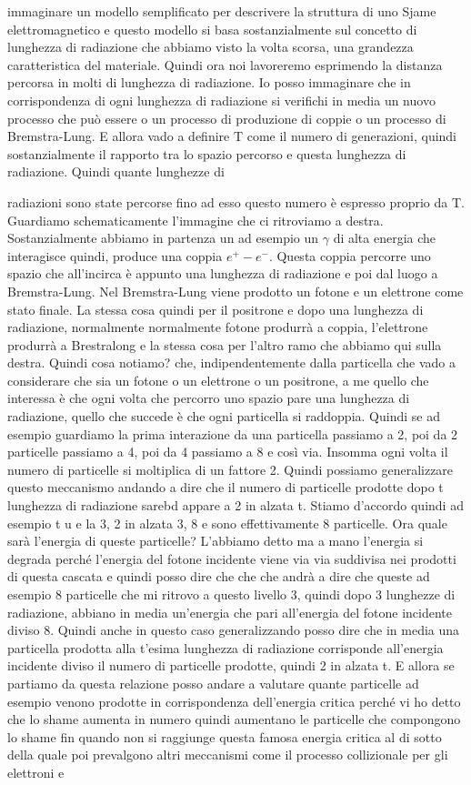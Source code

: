 {immaginare un modello semplificato per descrivere la struttura di uno Sjame elettromagnetico e questo modello si basa sostanzialmente sul concetto di lunghezza di radiazione che abbiamo visto la volta scorsa, una grandezza caratteristica del materiale. Quindi ora noi lavoreremo esprimendo la distanza percorsa in molti di lunghezza di radiazione. Io posso immaginare che in corrispondenza di ogni lunghezza di radiazione si verifichi in media un nuovo processo che può essere o un processo di produzione di coppie o un processo di Bremstra-Lung. E allora vado a definire T come il numero di generazioni, quindi sostanzialmente il rapporto tra lo spazio percorso e questa lunghezza di radiazione. Quindi quante lunghezze di 

radiazioni sono state percorse fino ad esso questo numero è espresso proprio da T. Guardiamo schematicamente l'immagine che ci ritroviamo a destra. Sostanzialmente abbiamo in partenza un ad esempio un $\gamma$ di alta energia che interagisce quindi, produce una coppia $e^+ - e^-$. Questa coppia percorre uno spazio che all'incirca è appunto una lunghezza di radiazione e poi dal luogo a Bremstra-Lung. Nel Bremstra-Lung viene prodotto un fotone e un elettrone come stato finale. La stessa cosa quindi per il positrone e dopo una lunghezza di radiazione, normalmente normalmente fotone produrrà a coppia, l'elettrone produrrà a Brestralong e la stessa cosa per l'altro ramo che abbiamo qui sulla destra. Quindi cosa notiamo? che, indipendentemente dalla particella che vado a considerare che sia un fotone o un elettrone o un positrone, a me quello che interessa è che ogni volta che percorro uno spazio pare una lunghezza di radiazione, quello che succede è che ogni particella si raddoppia. Quindi se ad esempio guardiamo la prima interazione da una particella passiamo a 2, poi da 2 particelle passiamo a 4, poi da 4 passiamo a 8 e così via. Insomma ogni volta il numero di particelle si moltiplica di un fattore 2. Quindi possiamo generalizzare questo meccanismo andando a dire che il numero di particelle prodotte dopo t lunghezza di radiazione sarebd appare a 2 in alzata t. Stiamo d'accordo quindi ad esempio t u e la 3, 2 in alzata 3, 8 e sono effettivamente 8 particelle. Ora quale sarà l'energia di queste particelle? L'abbiamo detto ma a mano l'energia si degrada perché l'energia del fotone incidente viene via via suddivisa nei prodotti di questa cascata e quindi posso dire che che che andrà a dire che queste ad esempio 8 particelle che mi ritrovo a questo livello 3, quindi dopo 3 lunghezze di radiazione, abbiano in media un'energia che pari all'energia del fotone incidente diviso 8. Quindi anche in questo caso generalizzando posso dire che in media una particella prodotta alla t'esima lunghezza di radiazione corrisponde all'energia incidente diviso il numero di particelle prodotte, quindi 2 in alzata t. E allora se partiamo da questa relazione posso andare a valutare quante particelle ad esempio venono prodotte in corrispondenza dell'energia critica perché vi ho detto che lo shame aumenta in numero quindi aumentano le particelle che compongono lo shame fin quando non si raggiunge questa famosa energia critica al di sotto della quale poi prevalgono altri meccanismi come il processo collizionale per gli elettroni e }
